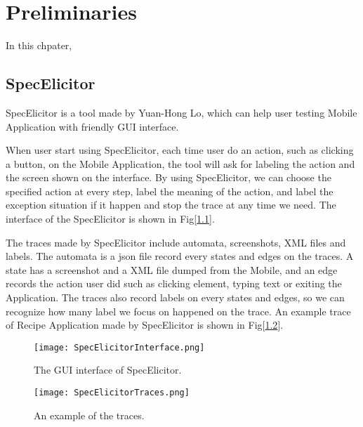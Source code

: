 \chapter{Preliminaries}\label{ch:preliminaries}

In this chpater, 

\section{SpecElicitor}

SpecElicitor is a tool made by Yuan-Hong Lo, 
which can help user testing Mobile Application with friendly GUI interface.

When user start using SpecElicitor,
each time user do an action, such as clicking a button, on the Mobile Application, 
the tool will ask for labeling the action and the screen shown on the interface.
By using SpecElicitor, we can choose the specified action at every step, label the meaning of the action,
and label the exception situation if it happen and stop the trace at any time we need.
The interface of the SpecElicitor is shown in Fig[\ref{SpecElicitorInterface}].


The traces made by SpecElicitor include automata, screenshots, XML files and labels.
The automata is a json file record every states and edges on the traces.
A state has a screenshot and a XML file dumped from the Mobile,
and an edge records the action user did such as clicking element, typing text or exiting the Application.
The traces also record labels on every states and edges,
so we can recognize how many label we focus on happened on the trace.
An example trace of Recipe Application made by SpecElicitor is shown in Fig[\ref{SpecElicitorTraces}].


\begin{figure}[ht]
	\graphicspath{{pic/}}
	\begin{center}
		\texttt{[image: SpecElicitorInterface.png]}
		\caption{ The GUI interface of SpecElicitor.  }
		\label{SpecElicitorInterface}
	\end{center}
\end{figure}

\begin{figure}[ht]
	\graphicspath{{pic/}}
	\begin{center}
		\texttt{[image: SpecElicitorTraces.png]}
		\caption{ An example of the traces.  }
		\label{SpecElicitorTraces}
	\end{center}
\end{figure}

